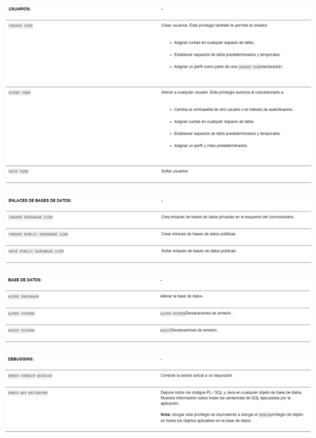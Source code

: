 \documentclass[12pt,letterpaper]{article}
\begin{document}
\begin{center}
  \includegraphics[width=14cm]{Imagenes/Privilegios_usuarios.png}\\
\end{center}

\begin{center}
  \includegraphics[width=14cm]{Imagenes/Privilegios_basedatos.png}\\
\end{center}
\break
\begin{center}
  \includegraphics[width=14cm]{Imagenes/Privilegios_datos.png}\\
\end{center}

\begin{center}
  \includegraphics[width=14cm]{Imagenes/Privilegios_debugging.png}\\
\end{center}
\end{document}
